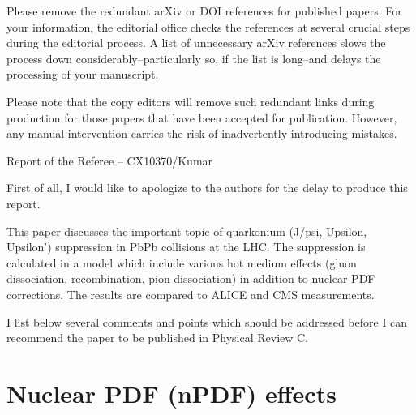 \documentclass[aps,prc,preprint,superscriptaddress,showpacs,showkeys]{revtex4-1}
\begin{document}
Please remove the redundant arXiv or DOI references for published
papers. For your information, the editorial office checks
the references at several crucial steps during the editorial
process. A list of unnecessary arXiv references slows the process
down considerably--particularly so, if the list is long--and delays
the processing of your manuscript.

Please note that the copy editors will remove such redundant links
during production for those papers that have been accepted for
publication. However, any manual intervention carries the risk of
inadvertently introducing mistakes.

\newpage


{\Large Report of the Referee -- CX10370/Kumar}
\bigskip
\bigskip
\bigskip
\bigskip

{\color{red} First of all, I would like to apologize to the authors for the delay
to produce this report.

This paper discusses the important topic of quarkonium (J/psi,
Upsilon, Upsilon') suppression in PbPb collisions at the LHC. The
suppression is calculated in a model which include various hot medium
effects (gluon dissociation, recombination, pion dissociation) in
addition to nuclear PDF corrections. The results are compared to ALICE
and CMS measurements.

I list below several comments and points which should be addressed
before I can recommend the paper to be published in Physical Review C.}







\section{Nuclear PDF (nPDF) effects}
\end{document}
